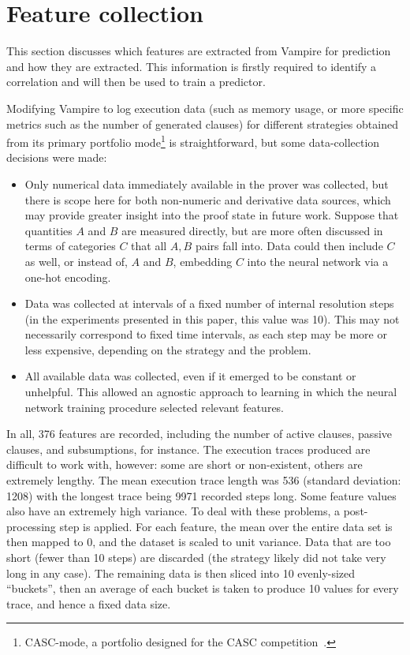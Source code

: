 \documentclass{llncs}
\newcommand{\vampire}{{Vampire}}
\begin{document}
\section{Feature collection} \label{sec:data}
%
This section discusses which features are extracted from \vampire{} for prediction and how they are extracted. This information is firstly required to identify a correlation and will then be used to train a predictor.

Modifying Vampire to log execution data (such as memory usage, or more specific metrics such as the number of generated clauses) for different strategies obtained from its primary portfolio mode\footnote{CASC-mode, a portfolio designed for the CASC competition~\cite{CASC}.} is straightforward, but some data-collection decisions were made:
\begin{itemize}
	\item Only numerical data immediately available in the prover was collected, but there is scope here for both non-numeric and derivative data sources, which may provide greater insight into the proof state in future work. Suppose that quantities \(A\) and \(B\) are measured directly, but are more often discussed in terms of categories \(C\) that all \(A, B\) pairs fall into. Data could then include \(C\) as well, or instead of, \(A\) and \(B\), embedding \(C\) into the neural network via a one-hot encoding.
	\item Data was collected at intervals of a fixed number of internal resolution steps (in the experiments presented in this paper, this value was 10). This may not necessarily correspond to fixed time intervals, as each step may be more or less expensive, depending on the strategy and the problem.
	\item All available data was collected, even if it emerged to be constant or unhelpful. This allowed an agnostic approach to learning in which the neural network training procedure selected relevant features.
\end{itemize}
In all, 376 features are recorded, including the number of active clauses, passive clauses, and subsumptions, for instance.
The execution traces produced are difficult to work with, however: some are short or non-existent, others are extremely lengthy. The mean execution trace length was 536 (standard deviation: 1208) with the longest trace being 9971 recorded steps long.
Some feature values also have an extremely high variance.
To deal with these problems, a post-processing step is applied.
For each feature, the mean over the entire data set is then mapped to 0, and the dataset is scaled to unit variance.
Data that are too short (fewer than 10 steps) are discarded (the strategy likely did not take very long in any case).
The remaining data is then sliced into 10 evenly-sized ``buckets'', then an average of each bucket is taken to produce 10 values for every trace, and hence a fixed data size.
\end{document}
